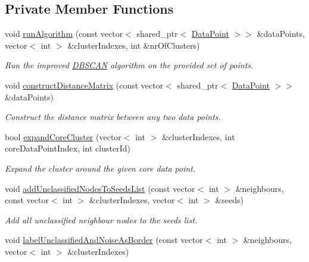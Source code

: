 \subsection*{\-Private \-Member \-Functions}
\begin{DoxyCompactItemize}
\item 
void \hyperlink{classmultiscale_1_1analysis_1_1DBSCAN_aceb5dd9fe24a24cbf09ddc9082dc1f82}{run\-Algorithm} (const vector$<$ shared\-\_\-ptr$<$ \hyperlink{classmultiscale_1_1analysis_1_1DataPoint}{\-Data\-Point} $>$$>$ \&data\-Points, vector$<$ int $>$ \&cluster\-Indexes, int \&nr\-Of\-Clusters)
\begin{DoxyCompactList}\small\item\em \-Run the improved \hyperlink{classmultiscale_1_1analysis_1_1DBSCAN}{\-D\-B\-S\-C\-A\-N} algorithm on the provided set of points. \end{DoxyCompactList}\item 
void \hyperlink{classmultiscale_1_1analysis_1_1DBSCAN_a4770eddfc02c41deb114e5d42affd93a}{construct\-Distance\-Matrix} (const vector$<$ shared\-\_\-ptr$<$ \hyperlink{classmultiscale_1_1analysis_1_1DataPoint}{\-Data\-Point} $>$$>$ \&data\-Points)
\begin{DoxyCompactList}\small\item\em \-Construct the distance matrix between any two data points. \end{DoxyCompactList}\item 
bool \hyperlink{classmultiscale_1_1analysis_1_1DBSCAN_a400c4e9fb1d9e9bafa970b33912a5ce1}{expand\-Core\-Cluster} (vector$<$ int $>$ \&cluster\-Indexes, int core\-Data\-Point\-Index, int cluster\-Id)
\begin{DoxyCompactList}\small\item\em \-Expand the cluster around the given core data point. \end{DoxyCompactList}\item 
void \hyperlink{classmultiscale_1_1analysis_1_1DBSCAN_a6ead683810b4f04a48cd0a4d0f5f7a6b}{add\-Unclassified\-Nodes\-To\-Seeds\-List} (const vector$<$ int $>$ \&neighbours, const vector$<$ int $>$ \&cluster\-Indexes, vector$<$ int $>$ \&seeds)
\begin{DoxyCompactList}\small\item\em \-Add all unclassified neighbour nodes to the seeds list. \end{DoxyCompactList}\item 
void \hyperlink{classmultiscale_1_1analysis_1_1DBSCAN_a5b0d19aab403005cac7fbe0851f5a969}{label\-Unclassified\-And\-Noise\-As\-Border} (const vector$<$ int $>$ \&neighbours, vector$<$ int $>$ \&cluster\-Indexes)

\end{DoxyCompactItemize}
